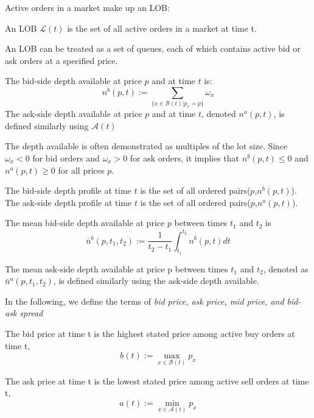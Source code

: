 Active orders in a market make up an LOB:
\begin{defn}
An LOB $\mathcal{L}(t)$ is the set of all active orders in a market at time t.
\end{defn} 

An LOB can be treated as a set of queues, each of which contains active bid or ask orders at a specified price.
\begin{defn}
The bid-side depth available at price $p$ and at time $t$ is:
\begin{equation*}
n^b(p,t):=\sum_{\{x \in \mathcal{B}(t)|p_x=p\}}\omega_x
\end{equation*}
The ask-side depth available at price $p$ and at time $t$, denoted $n^a(p,t)$, is defined similarly using $\mathcal{A}(t)$
\end{defn} 

The depth available is often demonstrated as multiples of the lot size. Since $\omega_x<0$ for bid orders and $\omega_x>0$ for ask orders, it implies that $n^b(p,t)\leq 0$ and $n^a(p,t)\geq 0$ for all prices $p$.
\begin{defn}
The bid-side depth profile at time $t$ is the set of all ordered pairs($p$,$n^b(p,t)$). The ask-side depth profile at time $t$ is the set of all ordered pairs($p$,$n^a(p,t)$).
\end{defn}

\begin{defn}
The mean bid-side depth available at price $p$ between times $t_1$ and $t_2$ is
\begin{equation*}
\bar{n}^b(p,t_1,t_2):=\frac{1}{t_2-t_1}\int_{t_1}^{t_2}n^b(p,t)dt
\end{equation*}

The mean ask-side depth available at price p between times $t_1$ and $t_2$, denoted as $\bar{n}^a(p,t_1,t_2)$, is defined similarly using the ask-side depth available.
\end{defn}

In the following, we define the terms of \textit{bid price, ask price, mid price, and bid-ask spread}
\begin{defn}
The bid price at time t is the highest stated price among active buy orders at time t,
\begin{equation*}
b(t):=\max_{x\in \mathcal{B}(t)}p_x
\end{equation*}

The ask price at time t is the lowest stated price among active sell orders at time t,
\begin{equation*}
a(t):=\min_{x\in \mathcal{A}(t)}p_x
\end{equation*}
\end{defn}

